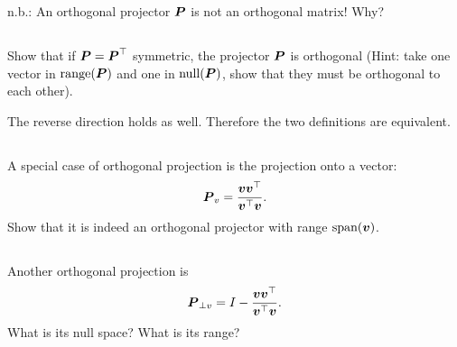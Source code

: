 \documentclass[11pt,letterpaper]{article}
\begin{document}
n.b.: An orthogonal projector $\boldsymbol{P}$ is not an orthogonal matrix! Why?

\subsection{}
Show that if $\boldsymbol{P}=\boldsymbol{P}^\top$ symmetric, the projector $\boldsymbol{P}$ is orthogonal (Hint: take one vector in $\text{range}(\boldsymbol{P})$ and one in $\text{null}(\boldsymbol{P})$, show that they must be orthogonal to each other). 

The reverse direction holds as well. Therefore the two definitions are equivalent.

\subsection{}
A special case of orthogonal projection is the projection onto a vector:
\begin{align*}
    \boldsymbol{P}_v = \frac{\boldsymbol{v} \boldsymbol{v}^\top}{\boldsymbol{v}^\top \boldsymbol{v}}.
\end{align*}
Show that it is indeed an orthogonal projector with range $\text{span}(\boldsymbol{v})$.

\subsection{}
Another orthogonal projection is
\begin{align*}
    \boldsymbol{P}_{\perp v} = I-\frac{\boldsymbol{v} \boldsymbol{v}^\top}{\boldsymbol{v}^\top \boldsymbol{v}}.
\end{align*}
What is its null space? What is its range?
\end{document}
